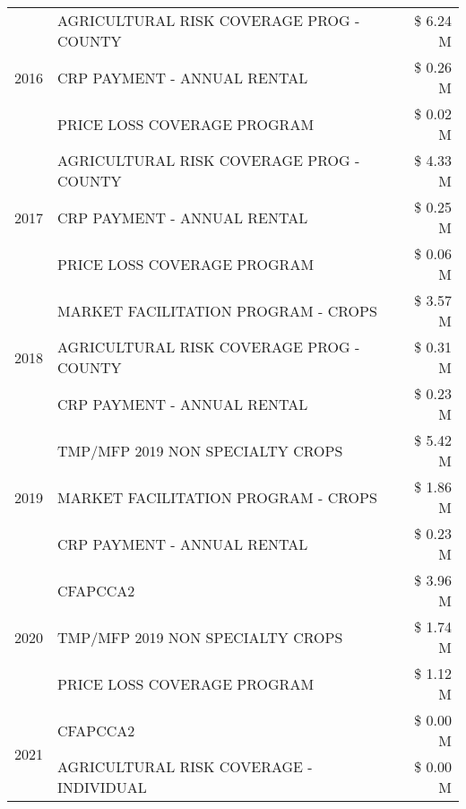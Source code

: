 \begin{tabular}{llr}
\cline{1-3}
\multirow[t]{3}{*}{2016} & AGRICULTURAL RISK COVERAGE PROG - COUNTY      & \$ 6.24 M \\
 & CRP PAYMENT - ANNUAL RENTAL                   & \$ 0.26 M \\
 & PRICE LOSS COVERAGE PROGRAM                   & \$ 0.02 M \\
\cline{1-3}
\multirow[t]{3}{*}{2017} & AGRICULTURAL RISK COVERAGE PROG - COUNTY & \$ 4.33 M \\
 & CRP PAYMENT - ANNUAL RENTAL & \$ 0.25 M \\
 & PRICE LOSS COVERAGE PROGRAM & \$ 0.06 M \\
\cline{1-3}
\multirow[t]{3}{*}{2018} & MARKET FACILITATION PROGRAM - CROPS & \$ 3.57 M \\
 & AGRICULTURAL RISK COVERAGE PROG - COUNTY & \$ 0.31 M \\
 & CRP PAYMENT - ANNUAL RENTAL & \$ 0.23 M \\
\cline{1-3}
\multirow[t]{3}{*}{2019} & TMP/MFP 2019 NON SPECIALTY CROPS & \$ 5.42 M \\
 & MARKET FACILITATION PROGRAM - CROPS & \$ 1.86 M \\
 & CRP PAYMENT - ANNUAL RENTAL & \$ 0.23 M \\
\cline{1-3}
\multirow[t]{3}{*}{2020} & CFAPCCA2 & \$ 3.96 M \\
 & TMP/MFP 2019 NON SPECIALTY CROPS & \$ 1.74 M \\
 & PRICE LOSS COVERAGE PROGRAM & \$ 1.12 M \\
\cline{1-3}
\multirow[t]{2}{*}{2021} & CFAPCCA2 & \$ 0.00 M \\
 & AGRICULTURAL RISK COVERAGE - INDIVIDUAL & \$ 0.00 M \\
\cline{1-3}
\bottomrule
\end{tabular}
